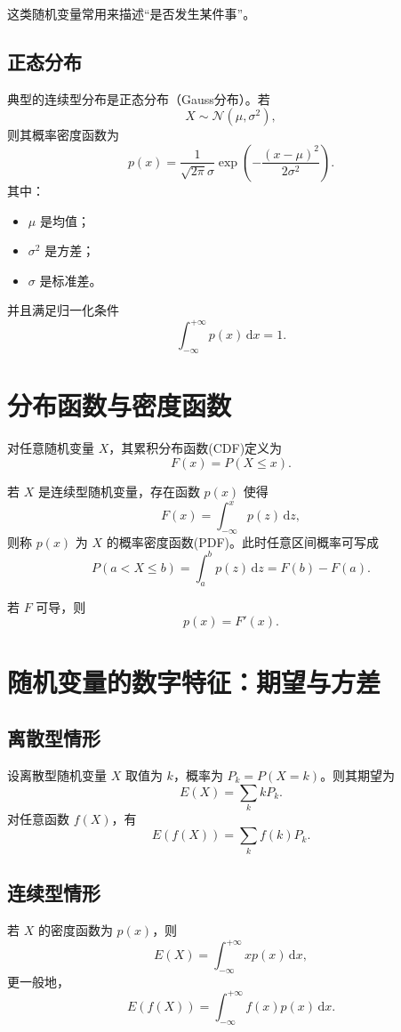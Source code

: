 这类随机变量常用来描述``是否发生某件事''。

\subsection{正态分布}

典型的连续型分布是正态分布（Gauss分布）。若
\[
X\sim \mathcal{N}(\mu,\sigma^2),
\]
则其概率密度函数为
\[
p(x)=\frac{1}{\sqrt{2\pi}\sigma}\exp\left(-\frac{(x-\mu)^2}{2\sigma^2}\right).
\]
其中：
\begin{itemize}
    \item \(\mu\) 是均值；
    \item \(\sigma^2\) 是方差；
    \item \(\sigma\) 是标准差。
\end{itemize}

并且满足归一化条件
\[
\int_{-\infty}^{+\infty} p(x)\,\mathrm{d}x=1.
\]

\section{分布函数与密度函数}

对任意随机变量 \(X\)，其累积分布函数(CDF)定义为
\[
F(x)=P(X\le x).
\]

若 \(X\) 是连续型随机变量，存在函数 \(p(x)\) 使得
\[
F(x)=\int_{-\infty}^{x} p(z)\,\mathrm{d}z,
\]
则称 \(p(x)\) 为 \(X\) 的概率密度函数(PDF)。此时任意区间概率可写成
\[
P(a<X\le b)=\int_a^b p(z)\,\mathrm{d}z = F(b)-F(a).
\]

若 \(F\) 可导，则
\[
p(x)=F'(x).
\]

\section{随机变量的数字特征：期望与方差}

\subsection{离散型情形}

设离散型随机变量 \(X\) 取值为 \(k\)，概率为 \(P_k=P(X=k)\)。则其期望为
\[
E(X)=\sum_k kP_k.
\]
对任意函数 \(f(X)\)，有
\[
E(f(X))=\sum_k f(k)P_k.
\]

\subsection{连续型情形}

若 \(X\) 的密度函数为 \(p(x)\)，则
\[
E(X)=\int_{-\infty}^{+\infty} xp(x)\,\mathrm{d}x,
\]
更一般地，
\[
E(f(X))=\int_{-\infty}^{+\infty} f(x)p(x)\,\mathrm{d}x.
\]

